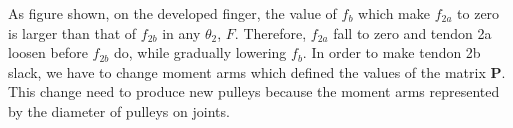 \documentclass{llncs}
\begin{document}
As figure shown, on the developed finger, the value of $f_b$ which make $f_{2a}$ to zero is larger than that of $f_{2b}$ in any $\theta_2$, $F$.
Therefore, $f_{2a}$ fall to zero and tendon 2a loosen before $f_{2b}$ do, while gradually lowering $f_b$.
In order to make tendon 2b slack, we have to change moment arms which defined the values of the matrix $\bm{P}$.
This change need to produce new pulleys because the moment arms represented by the diameter of pulleys on joints.
			

\end{document}
